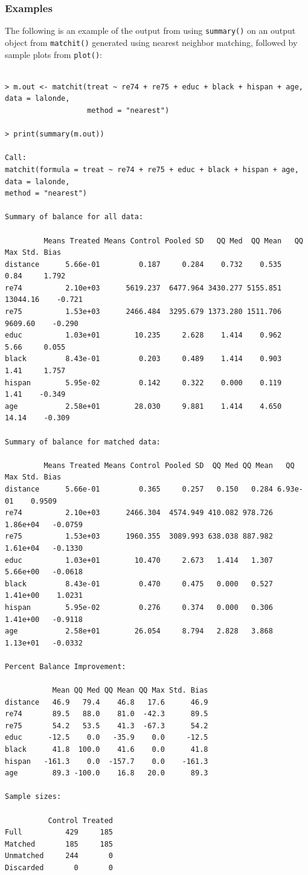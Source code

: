 \documentclass[oneside,letterpaper,titlepage]{article}
\begin{document}
\subsubsection{Examples}
The following is an example of the output from using
\texttt{summary()} on an output object from {\tt matchit()} generated
using nearest neighbor matching, followed by sample plots from
\texttt{plot()}:

\begin{verbatim}

> m.out <- matchit(treat ~ re74 + re75 + educ + black + hispan + age, data = lalonde, 
                   method = "nearest")
 
> print(summary(m.out))

Call:
matchit(formula = treat ~ re74 + re75 + educ + black + hispan + age, data = lalonde, 
method = "nearest")

Summary of balance for all data:

         Means Treated Means Control Pooled SD   QQ Med  QQ Mean   QQ Max Std. Bias
distance      5.66e-01         0.187     0.284    0.732    0.535     0.84     1.792 
re74          2.10e+03      5619.237  6477.964 3430.277 5155.851 13044.16    -0.721
re75          1.53e+03      2466.484  3295.679 1373.280 1511.706  9609.60    -0.290
educ          1.03e+01        10.235     2.628    1.414    0.962     5.66     0.055
black         8.43e-01         0.203     0.489    1.414    0.903     1.41     1.757
hispan        5.95e-02         0.142     0.322    0.000    0.119     1.41    -0.349
age           2.58e+01        28.030     9.881    1.414    4.650    14.14    -0.309
        
Summary of balance for matched data:

         Means Treated Means Control Pooled SD  QQ Med QQ Mean   QQ Max Std. Bias
distance      5.66e-01         0.365     0.257   0.150   0.284 6.93e-01    0.9509
re74          2.10e+03      2466.304  4574.949 410.082 978.726 1.86e+04   -0.0759
re75          1.53e+03      1960.355  3089.993 638.038 887.982 1.61e+04   -0.1330
educ          1.03e+01        10.470     2.673   1.414   1.307 5.66e+00   -0.0618
black         8.43e-01         0.470     0.475   0.000   0.527 1.41e+00    1.0231
hispan        5.95e-02         0.276     0.374   0.000   0.306 1.41e+00   -0.9118
age           2.58e+01        26.054     8.794   2.828   3.868 1.13e+01   -0.0332
        
Percent Balance Improvement:

           Mean QQ Med QQ Mean QQ Max Std. Bias
distance   46.9   79.4    46.8   17.6      46.9
re74       89.5   88.0    81.0  -42.3      89.5
re75       54.2   53.5    41.3  -67.3      54.2
educ      -12.5    0.0   -35.9    0.0     -12.5
black      41.8  100.0    41.6    0.0      41.8
hispan   -161.3    0.0  -157.7    0.0    -161.3
age        89.3 -100.0    16.8   20.0      89.3

Sample sizes:

          Control Treated
Full          429     185
Matched       185     185
Unmatched     244       0
Discarded       0       0

\end{verbatim}
\end{document}
